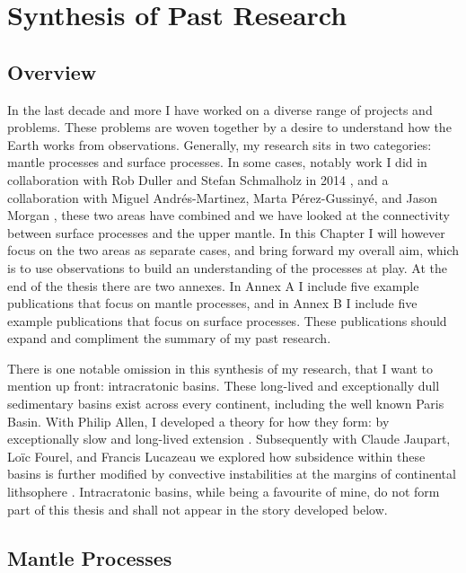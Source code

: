\chapter{Synthesis of Past Research}\label{ch:synthesis-of-past-research}


\section{Overview}\label{sec:overview}

In the last decade and more I have worked on a diverse range of projects and problems. These problems are woven together by a desire to understand how the Earth works from observations. Generally, my research sits in two categories: mantle processes and surface processes. In some cases, notably work I did in collaboration with Rob Duller and Stefan Schmalholz in 2014 \citep{armitage-etal-2014}, and a collaboration with Miguel Andrés-Martinez, Marta Pérez-Gussinyé, and Jason Morgan \citep{andres-martinez-etal-2019}, these two areas have combined and we have looked at the connectivity between surface processes and the upper mantle. In this Chapter I will however focus on the two areas as separate cases, and bring forward my overall aim, which is to use observations to build an understanding of the processes at play. At the end of the thesis there are two annexes. In Annex A I include five example publications that focus on mantle processes, and in Annex B I include five example publications that focus on surface processes. These publications should expand and compliment the summary of my past research.

There is one notable omission in this synthesis of my research, that I want to mention up front: intracratonic basins. These long-lived and exceptionally dull sedimentary basins exist across every continent, including the well known Paris Basin. With Philip Allen, I developed a theory for how they form: by exceptionally slow and long-lived extension \citep{armitage-2010,allen-2012}. Subsequently with Claude Jaupart, Loïc Fourel, and Francis Lucazeau we explored how subsidence within these basins is further modified by convective instabilities at the margins of continental lithsophere \citep{armitage-etal-jgr-2013,lucazeau-etal-2015}. Intracratonic basins, while being a favourite of mine, do not form part of this thesis and shall not appear in the story developed below.

\section{Mantle Processes}


